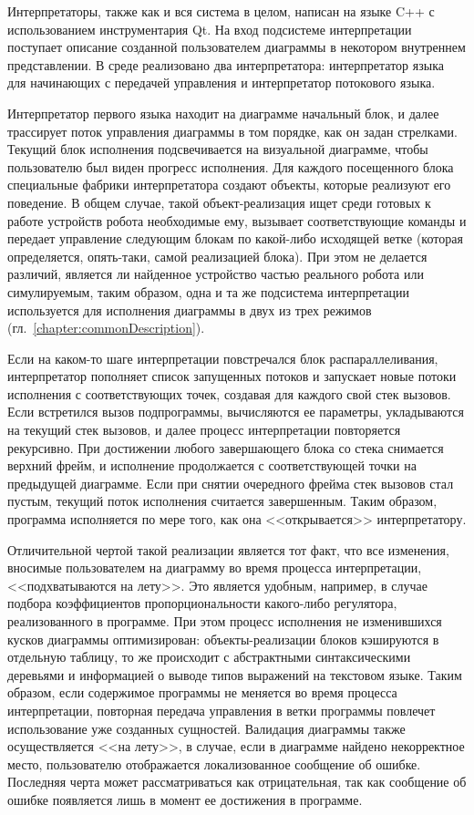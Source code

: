 \documentclass[a5paper]{article}
\begin{document}
Интерпретаторы, также как и вся система в целом, написан на языке C++ с использованием инструментария Qt. На вход подсистеме интерпретации поступает описание созданной пользователем диаграммы в некотором внутреннем представлении. В среде реализовано два интерпретатора: интерпретатор языка для начинающих с передачей управления и интерпретатор потокового языка.

Интерпретатор первого языка находит на диаграмме начальный блок, и далее трассирует поток управления диаграммы в том порядке, как он задан стрелками.  Текущий блок исполнения подсвечивается на визуальной диаграмме, чтобы пользователю был виден прогресс исполнения. Для каждого посещенного блока специальные фабрики интерпретатора создают объекты, которые реализуют его поведение. В общем случае, такой объект-реализация ищет среди готовых к работе устройств робота необходимые ему, вызывает соответствующие команды и передает управление следующим блокам по какой-либо исходящей ветке (которая определяется, опять-таки, самой реализацией блока). При этом не делается различий, является ли найденное устройство частью реального робота или симулируемым, таким образом, одна и та же подсистема интерпретации используется для исполнения диаграммы в двух из трех режимов (гл.~\ref{chapter:commonDescription}).

Если на каком-то шаге интерпретации повстречался блок распараллеливания, интерпретатор пополняет список запущенных потоков и запускает новые потоки исполнения с соответствующих точек, создавая для каждого свой стек вызовов. Если встретился вызов подпрограммы, вычисляются ее параметры, укладываются на текущий стек вызовов, и далее процесс интерпретации повторяется рекурсивно. При достижении любого завершающего блока со стека снимается верхний фрейм, и исполнение продолжается с соответствующей точки на предыдущей диаграмме. Если при снятии очередного фрейма стек вызовов стал пустым, текущий поток исполнения считается завершенным. Таким образом, программа исполняется по мере того, как она <<открывается>> интерпретатору.

Отличительной чертой такой реализации является тот факт, что все изменения, вносимые пользователем на диаграмму во время процесса интерпретации, <<подхватываются на лету>>. Это является удобным, например, в случае подбора коэффициентов пропорциональности какого-либо регулятора, реализованного в программе. При этом процесс исполнения не изменившихся кусков диаграммы оптимизирован: объекты-реализации блоков кэшируются в отдельную таблицу, то же происходит с абстрактными синтаксическими деревьями и информацией о выводе типов выражений на текстовом языке. Таким образом, если содержимое программы не меняется во время процесса интерпретации, повторная передача управления в ветки программы повлечет использование уже созданных сущностей. Валидация диаграммы также осуществляется <<на лету>>, в случае, если в диаграмме найдено некорректное место, пользователю отображается локализованное сообщение об ошибке. Последняя черта может рассматриваться как отрицательная, так как сообщение об ошибке появляется лишь в момент ее достижения в программе.
\end{document}
